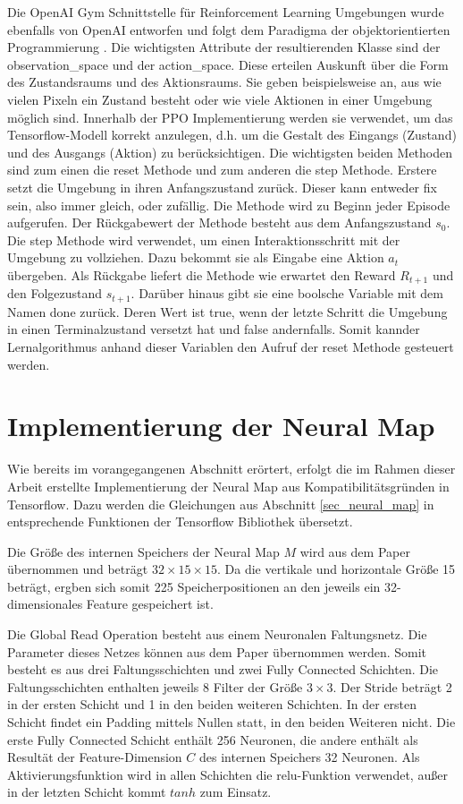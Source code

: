 Die OpenAI Gym Schnittstelle für Reinforcement Learning Umgebungen wurde ebenfalls von OpenAI entworfen und folgt dem Paradigma der objektorientierten Programmierung \cite{Gym}. Die wichtigsten Attribute der resultierenden Klasse sind der observation\_space und der action\_space. Diese erteilen Auskunft über die Form des Zustandsraums und des Aktionsraums. Sie geben beispielsweise an, aus wie vielen Pixeln ein Zustand besteht oder wie viele Aktionen in einer Umgebung möglich sind. Innerhalb der PPO Implementierung werden sie verwendet, um das Tensorflow-Modell korrekt anzulegen, d.h. um die Gestalt des Eingangs (Zustand) und des Ausgangs (Aktion) zu berücksichtigen. Die wichtigsten beiden Methoden sind zum einen die reset Methode und zum anderen die step Methode. Erstere setzt die Umgebung in ihren Anfangszustand zurück. Dieser kann entweder fix sein, also immer gleich, oder zufällig. Die Methode wird zu Beginn jeder Episode aufgerufen. Der Rückgabewert der Methode besteht aus dem Anfangszustand $s_0$. Die step Methode wird verwendet, um einen Interaktionsschritt mit der Umgebung zu vollziehen. Dazu bekommt sie als Eingabe eine Aktion $a_t$ übergeben. Als Rückgabe liefert die Methode wie erwartet den Reward $R_{t+1}$ und den Folgezustand $s_{t+1}$. Darüber hinaus gibt sie eine boolsche Variable mit dem Namen done zurück. Deren Wert ist true, wenn der letzte Schritt die Umgebung in einen Terminalzustand versetzt hat und false andernfalls. Somit kannder Lernalgorithmus anhand dieser Variablen den Aufruf der reset Methode gesteuert werden.


\section{Implementierung der Neural Map}
\label{sec_nm_impl}

Wie bereits im vorangegangenen Abschnitt erörtert, erfolgt die im Rahmen dieser Arbeit erstellte Implementierung der Neural Map aus Kompatibilitätsgründen in Tensorflow. Dazu werden die Gleichungen aus Abschnitt \ref{sec_neural_map} in entsprechende Funktionen der Tensorflow Bibliothek übersetzt.

Die Größe des internen Speichers der Neural Map $M$ wird aus dem Paper übernommen und beträgt $32 \times 15 \times 15$. Da die vertikale und horizontale Größe 15 beträgt, ergben sich somit 225 Speicherpositionen an den jeweils ein 32-dimensionales Feature gespeichert ist.

Die Global Read Operation besteht aus einem Neuronalen Faltungsnetz. Die Parameter dieses Netzes können aus dem Paper übernommen werden. Somit besteht es aus drei Faltungsschichten und zwei Fully Connected Schichten. Die Faltungsschichten enthalten jeweils 8 Filter der Größe $3 \times 3$. Der Stride beträgt 2 in der ersten Schicht und 1 in den beiden weiteren Schichten. In der ersten Schicht findet ein Padding mittels Nullen statt, in den beiden Weiteren nicht. Die erste Fully Connected Schicht enthält 256 Neuronen, die andere enthält als Resultät der Feature-Dimension $C$ des internen Speichers 32 Neuronen. Als Aktivierungsfunktion wird in allen Schichten die relu-Funktion verwendet, außer in der letzten Schicht kommt $tanh$ zum Einsatz.

